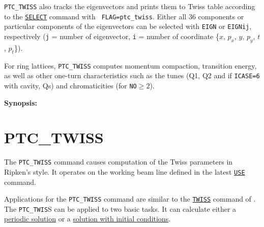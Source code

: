 {\tt PTC\_TWISS} also tracks the eigenvectors and prints them to Twiss table
according to the \hyperref[sec:select]{\tt SELECT} command  with {\tt
  FLAG=ptc\_twiss}. 
Either all 36 components or particular components of the eigenvectors
can be selected with {\tt EIGN} or {\tt EIGNij}, respectively ({\tt j} = number of
eigenvector, {\tt i} = number of coordinate \{$x$, $p_x$, $y$, $p_y$,
$t$, $p_t$\}). 

For ring lattices, {\tt PTC\_TWISS} computes momentum compaction, transition
energy, as well as other one-turn characteristics such as the tunes
(Q1, Q2 and if {\tt ICASE=6} with cavity, Qs) and chromaticities (for
{\tt NO}$\geq 2$).  

{\bf Synopsis:}

\section{PTC\_TWISS}
\label{sec:ptc_twiss}
 
The {\tt PTC\_TWISS} command causes computation of the Twiss
parameters in Ripken's style. It operates on the working beam line
defined in the latest \hyperref[sec:use]{\tt USE} command. 

Applications for the {\tt PTC\_TWISS} command are similar to the
\hyperref[chap:twiss]{\tt TWISS} command of \madx. 
The {\tt PTC\_TWIS}S can be applied to two basic tasks. It can calculate either a
\hyperlink{Periodic_Solution}{periodic solution} or a
\hyperlink{Initial_Conditions}{solution with initial conditions}. 


